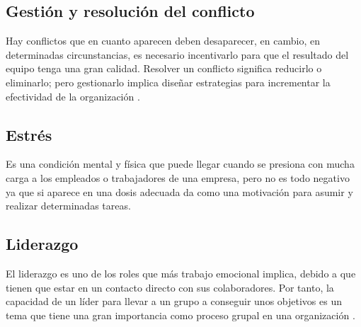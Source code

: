 \subsection{Gestión y resolución del conflicto}
Hay conflictos que en cuanto aparecen deben desaparecer, en cambio, en
determinadas circunstancias, es necesario incentivarlo para que el resultado del
equipo tenga una gran calidad. Resolver un conflicto significa reducirlo o
eliminarlo; pero gestionarlo implica diseñar estrategias para incrementar la
efectividad de la organización \parencite{ayuso2016}.
\subsection{Estrés}
Es una condición mental y física que puede llegar cuando se presiona con mucha
carga a los empleados o trabajadores de una empresa, pero no es todo negativo ya
que si aparece en una dosis adecuada da como una motivación para asumir y
realizar determinadas tareas.
\subsection{Liderazgo}
El liderazgo es uno de los roles que más trabajo emocional implica, debido a que
tienen que estar en un contacto directo con sus colaboradores. Por tanto, la
capacidad de un líder para llevar a un grupo a conseguir unos objetivos es un
tema que tiene una gran importancia como proceso grupal en una organización
\parencite{ayuso2016}.
